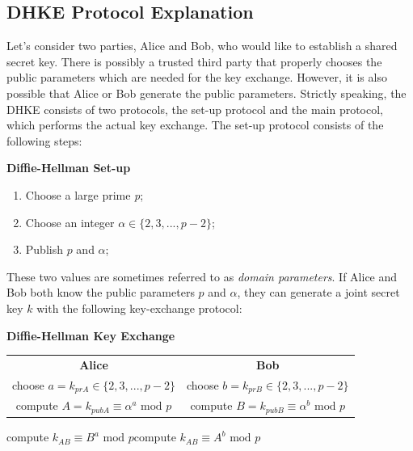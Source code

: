 \documentclass[11pt, a4paper]{article}
\newcommand{\mymod}{
    \text{ mod }
}
\begin{document}
\subsection{DHKE Protocol Explanation}
Let's consider two parties, Alice and Bob, who would like to establish a shared secret key. There is possibly a trusted third party that properly chooses the public parameters which are needed for the key exchange. However, it is also possible that Alice or Bob generate the public parameters. Strictly speaking, the DHKE consists of two protocols, the set-up protocol and the main protocol, which performs the actual key exchange. The set-up protocol consists of the following steps:
\begin{framed}
    \hfill\break\textbf{Diffie-Hellman Set-up}
    \begin{enumerate}
        \item Choose a large prime \textit{p};
        \item Choose an integer $\alpha\in\{2,3,...,p-2\}$;
        \item Publish $p$ and $\alpha$;
    \end{enumerate}
\end{framed}
These two values are sometimes referred to as \textit{domain parameters}. If Alice and Bob both know the public parameters $p$ and $\alpha$, they can generate a joint secret key $k$ with the following key-exchange protocol:
\begin{framed}
    \hfill\break\textbf{Diffie-Hellman Key Exchange}
    \begin{center}
        \begin{tabular}{c@{\hskip 3cm}c}
            \textbf{Alice}&\textbf{Bob}\\
            choose $a=k_{prA}\in\{2,3,...,p-2\}$&choose $b=k_{prB}\in\{2,3,...,p-2\}$\\
            compute $A=k_{pubA}\equiv\alpha^a\mymod p$&compute $B=k_{pubB}\equiv\alpha^b\mymod p$
        \end{tabular}
    \end{center}
    \hspace{2cm}compute $k_{AB}\equiv B^a\mymod p$\hspace{4.25cm}compute $k_{AB}\equiv A^b\mymod p$
\end{framed}
\end{document}
